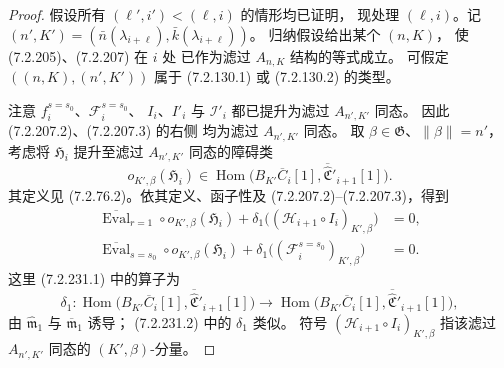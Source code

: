 \begin{proof}
假设所有 $(\ell',i')<(\ell,i)$ 的情形均已证明，
现处理 $(\ell,i)$。记
$(n',K')=(\bar n(\lambda_{i+\ell}),
\bar k(\lambda_{i+\ell}))$。
归纳假设给出某个 $(n,K)$，
使 (7.2.205)、(7.2.207) 在 $i$ 处
已作为滤过 $A_{n,K}$ 结构的等式成立。
可假定 $((n,K),(n',K'))$ 属于
(7.2.130.1) 或 (7.2.130.2) 的类型。

注意 $f_i^{s=s_0}$、$\mathcal F_i^{s=s_0}$、
$I_i$、$I'_i$ 与 $\mathcal I'_i$
都已提升为滤过 $A_{n',K'}$ 同态。
因此 (7.2.207.2)、(7.2.207.3) 的右侧
均为滤过 $A_{n',K'}$ 同态。
取 $\beta\in\mathfrak G$、$\lVert\beta\rVert=n'$，
考虑将 $\mathfrak H_i$ 提升至滤过
$A_{n',K'}$ 同态的障碍类
\[
o_{K',\beta}(\mathfrak H_i)
\in\operatorname{Hom}\bigl(
B_{K'}\overline C_i[1],
\overline{\widehat{\mathfrak C}}'_{i+1}[1]
\bigr).
\]
其定义见 (7.2.76.2)。依其定义、函子性及
(7.2.207.2)--(7.2.207.3)，得到
\begin{align}
\overline{\operatorname{Eval}}_{r=1}\circ
o_{K',\beta}(\mathfrak H_i)
+\delta_1\bigl((\mathcal H_{i+1}\circ I_i)_{K',\beta}\bigr)
&=0,
\tag{7.2.231.1}\label{eq:7-2-231-1}\\
\overline{\operatorname{Eval}}_{s=s_0}\circ
o_{K',\beta}(\mathfrak H_i)
+\delta_1\bigl((\mathcal F_i^{s=s_0})_{K',\beta}\bigr)
&=0.
\tag{7.2.231.2}\label{eq:7-2-231-2}
\end{align}
这里 (7.2.231.1) 中的算子为
\[
\delta_1\colon
\operatorname{Hom}\bigl(B_{K'}\overline C_i[1],
\overline{\widehat{\mathfrak C}}'_{i+1}[1]\bigr)
\longrightarrow
\operatorname{Hom}\bigl(B_{K'}\overline C_i[1],
\overline{\widehat{\mathfrak C}}'_{i+1}[1]\bigr),
\]
由 $\widehat{\mathfrak m}_1$ 与
$\overline{\mathfrak m}_1$ 诱导；
(7.2.231.2) 中的 $\delta_1$ 类似。
符号 $(\mathcal H_{i+1}\circ I_i)_{K',\beta}$
指该滤过 $A_{n',K'}$ 同态的
$(K',\beta)$-分量。


\end{proof}
